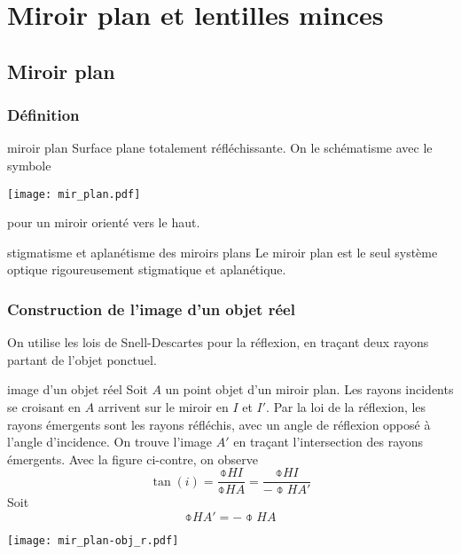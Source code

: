 \documentclass[../main/main.tex]{subfiles}
\begin{document}
\setcounter{chapter}{2}

\chapter{Miroir plan et lentilles minces}

\section{Miroir plan}

\subsection{Définition}

\begin{tcbraster}[raster columns=2, raster equal height=rows]
    \begin{defi}[label=def:mir]{miroir plan}
        Surface plane totalement réfléchissante. On le schématisme avec le symbole
        \begin{center}
            \texttt{[image: mir\_plan.pdf]}
        \end{center}
        pour un miroir orienté vers le haut.
    \end{defi}
    \begin{ror}[label=mirstig]{stigmatisme et aplanétisme des miroirs plans}
        Le miroir plan est le seul système optique rigoureusement stigmatique et
        aplanétique.
    \end{ror}
\end{tcbraster}

\subsection{Construction de l'image d'un objet réel}

On utilise les lois de Snell-Descartes pour la réflexion, en traçant deux rayons
partant de l'objet ponctuel.

\begin{exem}[label=exem:mir, sidebyside]{image d'un objet réel}
    Soit $A$ un point objet d'un miroir plan. Les rayons incidents se croisant
    en $A$ arrivent sur le miroir en $I$ et $I'$. Par la loi de la réflexion,
    les rayons émergents sont les rayons réfléchis, avec un angle de réflexion
    opposé à l'angle d'incidence. On trouve l'image $A'$ en traçant
    l'intersection des rayons émergents. \bigbreak
    Avec la figure ci-contre, on observe
    \[\tan(i) = \frac{\obar{HI}}{\obar{HA}} = \frac{\obar{HI}}{-\obar{HA'}}\]
    Soit \[ \boxed{\obar{HA'} = -\obar{HA}}\]
    \tcblower
    \begin{center}
        \texttt{[image: mir\_plan-obj\_r.pdf]}
        \label{fig:mir_plan-obj_r}
    \end{center}
\end{exem}
\end{document}
